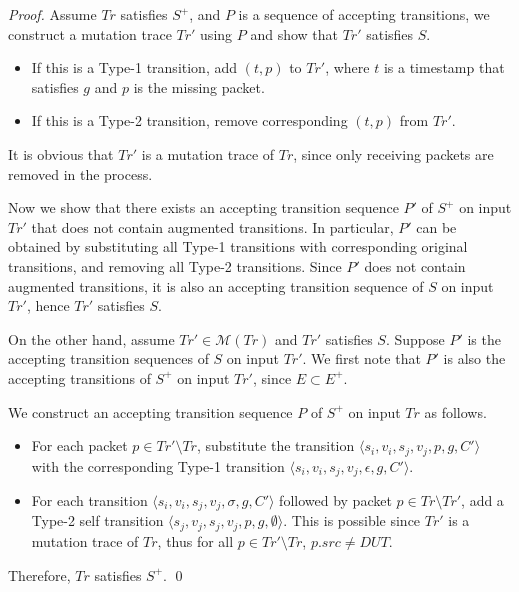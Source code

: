 \begin{proof}
  Assume $Tr$ satisfies $S^+$, and $P$ is a sequence of accepting transitions,
  we construct a mutation trace $Tr'$ using $P$ and show that $Tr'$ satisfies
  $S$.

  \begin{itemize}
    \item If this is a Type-1 transition, add $(t, p)$ to $Tr'$, where $t$ is a
      timestamp that satisfies $g$ and $p$ is the missing packet.
    \item If this is a Type-2 transition, remove corresponding $(t, p)$ from
      $Tr'$.
  \end{itemize}
  It is obvious that $Tr'$ is a mutation trace of $Tr$, since only receiving
  packets are removed in the process.

  Now we show that there exists an accepting transition sequence $P'$ of $S^+$ on
  input $Tr'$ that does not contain augmented transitions.  In particular, $P'$
  can be obtained by substituting all Type-1 transitions with corresponding
  original transitions, and removing all Type-2 transitions.  Since $P'$ does not
  contain augmented transitions, it is also an accepting transition sequence of
  $S$ on input $Tr'$, hence $Tr'$ satisfies $S$.

  On the other hand, assume $Tr' \in \mathcal{M}(Tr)$ and $Tr'$ satisfies $S$.
  Suppose $P'$ is the accepting transition sequences of $S$ on input $Tr'$.
  We first note that $P'$ is also the accepting transitions of $S^+$ on input
  $Tr'$, since $E \subset E^+$.

  We construct an accepting transition sequence $P$ of $S^+$ on input $Tr$ as
  follows.
  \begin{itemize}
    \item For each packet $p \in Tr' \setminus Tr$, substitute the transition
      $\langle s_i, v_i, s_j, v_j, p, g, C'\rangle$ with the corresponding Type-1
      transition $\langle s_i, v_i, s_j, v_j, \epsilon, g, C'\rangle$.
    \item For each transition $\langle s_i, v_i, s_j, v_j, \sigma, g, C'\rangle$
      followed by packet $p \in Tr\setminus Tr'$, add a Type-2 self
      transition $\langle s_j, v_j, s_j, v_j, p, g, \emptyset\rangle$. This is
      possible since $Tr'$ is a mutation trace of $Tr$, thus  for all $p \in Tr'
      \setminus Tr$, $p.src \ne DUT$.
  \end{itemize}
  Therefore, $Tr$ satisfies $S^+$.
  \qed
\end{proof}


